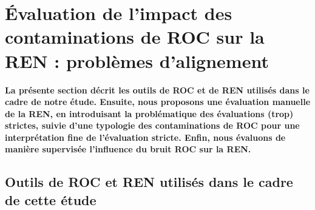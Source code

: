 \section{Évaluation de l'impact des contaminations de ROC sur la REN : problèmes d'alignement} 
\label{sec:OCR-IMPACT-NER}
\textbf{La présente section décrit les outils de ROC et de REN utilisés dans le cadre de notre étude. Ensuite, nous proposons une évaluation manuelle de la REN, en introduisant la problématique des évaluations (trop) strictes, suivie d'une typologie des contaminations de ROC pour une interprétation fine de l'évaluation stricte. Enfin, nous évaluons de manière supervisée l'influence du bruit ROC sur la REN.}

\subsection{Outils de ROC et REN utilisés dans le cadre de cette étude}
\label{subsec:outils_OCR-IMPACT-NER}

